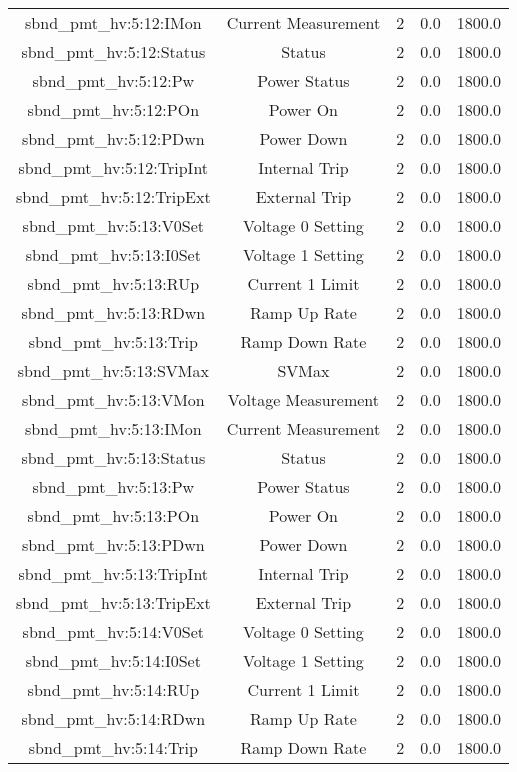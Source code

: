 \begin{table}[ptb]
\begin{tabular}{c | c c c c}
sbnd_pmt_hv:5:12:IMon & Current Measurement & 2 & 0.0 & 1800.0\\ 
sbnd_pmt_hv:5:12:Status & Status & 2 & 0.0 & 1800.0\\ 
sbnd_pmt_hv:5:12:Pw & Power Status & 2 & 0.0 & 1800.0\\ 
sbnd_pmt_hv:5:12:POn & Power On & 2 & 0.0 & 1800.0\\ 
sbnd_pmt_hv:5:12:PDwn & Power Down & 2 & 0.0 & 1800.0\\ 
sbnd_pmt_hv:5:12:TripInt & Internal Trip & 2 & 0.0 & 1800.0\\ 
sbnd_pmt_hv:5:12:TripExt & External Trip & 2 & 0.0 & 1800.0\\ 
sbnd_pmt_hv:5:13:V0Set & Voltage 0 Setting & 2 & 0.0 & 1800.0\\ 
sbnd_pmt_hv:5:13:I0Set & Voltage 1 Setting & 2 & 0.0 & 1800.0\\ 
sbnd_pmt_hv:5:13:RUp & Current 1 Limit & 2 & 0.0 & 1800.0\\ 
sbnd_pmt_hv:5:13:RDwn & Ramp Up Rate & 2 & 0.0 & 1800.0\\ 
sbnd_pmt_hv:5:13:Trip & Ramp Down Rate & 2 & 0.0 & 1800.0\\ 
sbnd_pmt_hv:5:13:SVMax & SVMax & 2 & 0.0 & 1800.0\\ 
sbnd_pmt_hv:5:13:VMon & Voltage Measurement & 2 & 0.0 & 1800.0\\ 
sbnd_pmt_hv:5:13:IMon & Current Measurement & 2 & 0.0 & 1800.0\\ 
sbnd_pmt_hv:5:13:Status & Status & 2 & 0.0 & 1800.0\\ 
sbnd_pmt_hv:5:13:Pw & Power Status & 2 & 0.0 & 1800.0\\ 
sbnd_pmt_hv:5:13:POn & Power On & 2 & 0.0 & 1800.0\\ 
sbnd_pmt_hv:5:13:PDwn & Power Down & 2 & 0.0 & 1800.0\\ 
sbnd_pmt_hv:5:13:TripInt & Internal Trip & 2 & 0.0 & 1800.0\\ 
sbnd_pmt_hv:5:13:TripExt & External Trip & 2 & 0.0 & 1800.0\\ 
sbnd_pmt_hv:5:14:V0Set & Voltage 0 Setting & 2 & 0.0 & 1800.0\\ 
sbnd_pmt_hv:5:14:I0Set & Voltage 1 Setting & 2 & 0.0 & 1800.0\\ 
sbnd_pmt_hv:5:14:RUp & Current 1 Limit & 2 & 0.0 & 1800.0\\ 
sbnd_pmt_hv:5:14:RDwn & Ramp Up Rate & 2 & 0.0 & 1800.0\\ 
sbnd_pmt_hv:5:14:Trip & Ramp Down Rate & 2 & 0.0 & 1800.0\\ 

\end{tabular}
\end{table}
